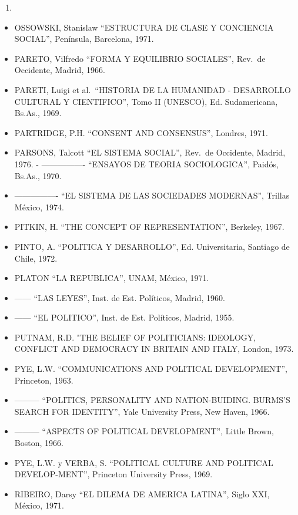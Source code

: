 \documentclass[
]{book}
\providecommand{\tightlist}{%
  \setlength{\itemsep}{0pt}\setlength{\parskip}{0pt}}
\begin{document}
\begin{enumerate}
\def\labelenumi{\arabic{enumi}.}
\setcounter{enumi}{1964}
\tightlist
\item
\end{enumerate}

\begin{itemize}
\tightlist
\item
  OSSOWSKI, Stanislaw ``ESTRUCTURA DE CLASE Y CONCIENCIA SOCIAL'', Península,
  Barcelona, 1971.
\item
  PARETO, Vilfredo ``FORMA Y EQUILIBRIO SOCIALES'', Rev.~de Occidente, Madrid, 1966.
\item
  PARETI, Luigi et al.~``HISTORIA DE LA HUMANIDAD - DESARROLLO CULTURAL Y
  CIENTIFICO'', Tomo II (UNESCO), Ed. Sudamericana, Bs.As., 1969.
\item
  PARTRIDGE, P.H. ``CONSENT AND CONSENSUS'', Londres, 1971.
\item
  PARSONS, Talcott ``EL SISTEMA SOCIAL'', Rev.~de Occidente, Madrid, 1976. - ---------------- ``ENSAYOS DE TEORIA SOCIOLOGICA'', Paidós, Bs.As., 1970.
\item
  ---------------- ``EL SISTEMA DE LAS SOCIEDADES MODERNAS'', Trillas México, 1974.
\item
  PITKIN, H. ``THE CONCEPT OF REPRESENTATION'', Berkeley, 1967.
\item
  PINTO, A. ``POLITICA Y DESARROLLO'', Ed. Universitaria, Santiago de Chile, 1972.
\item
  PLATON ``LA REPUBLICA'', UNAM, México, 1971.
\item
  ------ ``LAS LEYES'', Inst. de Est. Políticos, Madrid, 1960.
\item
  ------ ``EL POLITICO'', Inst. de Est. Políticos, Madrid, 1955.
\item
  PUTNAM, R.D. "THE BELIEF OF POLITICIANS: IDEOLOGY, CONFLICT AND
  DEMOCRACY IN BRITAIN AND ITALY, London, 1973.
\item
  PYE, L.W. ``COMMUNICATIONS AND POLITICAL DEVELOPMENT'', Princeton, 1963.
\item
  --------- ``POLITICS, PERSONALITY AND NATION-BUIDING. BURMS'S SEARCH FOR
  IDENTITY'', Yale University Press, New Haven, 1966.
\item
  --------- ``ASPECTS OF POLITICAL DEVELOPMENT'', Little Brown, Boston, 1966.
\item
  PYE, L.W. y VERBA, S. ``POLITICAL CULTURE AND POLITICAL DEVELOP-MENT'',
  Princeton University Press, 1969.
\item
  RIBEIRO, Darsy ``EL DILEMA DE AMERICA LATINA'', Siglo XXI, México, 1971.

\end{itemize}
\end{document}
